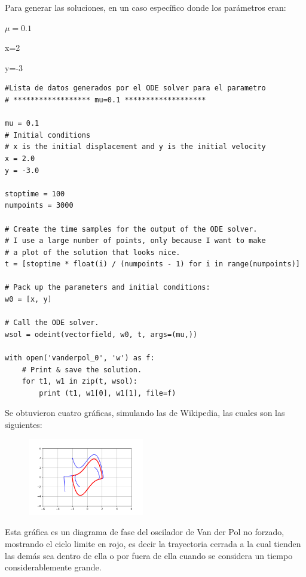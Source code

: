 \documentclass[a4paper]{article}
\begin{document}
Para generar las soluciones, en un caso específico donde los parámetros eran:

\begin{center}
$\mu=0.1$

x=2

y=-3
\end{center}

\begin{verbatim}
#Lista de datos generados por el ODE solver para el parametro
# ****************** mu=0.1 *******************

mu = 0.1
# Initial conditions
# x is the initial displacement and y is the initial velocity
x = 2.0
y = -3.0

stoptime = 100
numpoints = 3000

# Create the time samples for the output of the ODE solver.
# I use a large number of points, only because I want to make
# a plot of the solution that looks nice.
t = [stoptime * float(i) / (numpoints - 1) for i in range(numpoints)]

# Pack up the parameters and initial conditions:
w0 = [x, y]

# Call the ODE solver.
wsol = odeint(vectorfield, w0, t, args=(mu,))

with open('vanderpol_0', 'w') as f:
    # Print & save the solution.
    for t1, w1 in zip(t, wsol):
        print (t1, w1[0], w1[1], file=f)
\end{verbatim}

Se obtuvieron cuatro gráficas, simulando las de Wikipedia, las cuales son las siguientes:

\begin{figure}[ht!]
\centering
\includegraphics[width=0.45\textwidth]{Figura1.png}
\end{figure}

Esta gráfica es un diagrama de fase del oscilador de Van der Pol no forzado, mostrando el ciclo limite en rojo, es decir la trayectoria cerrada a la cual tienden las demás sea dentro de ella o por fuera de ella cuando se considera un tiempo considerablemente grande.
\end{document}
